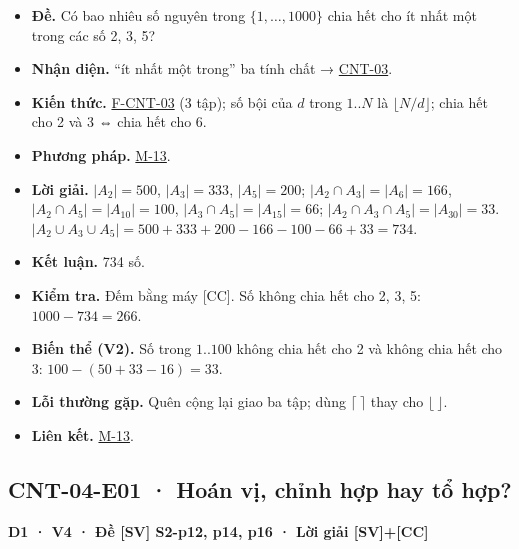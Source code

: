 \documentclass[
  10pt,
  twoside,openany]{book}
\providecommand{\tightlist}{%
  \setlength{\itemsep}{0pt}\setlength{\parskip}{0pt}}
\begin{document}
\begin{itemize}
\tightlist
\item
  \textbf{Đề.} Có bao nhiêu số nguyên trong \(\{1,\dots,1000\}\) chia
  hết cho ít nhất một trong các số 2, 3, 5?
\item
  \textbf{Nhận diện.} ``ít nhất một trong'' ba tính chất →
  \protect\hyperlink{CNT-03}{CNT-03}.
\item
  \textbf{Kiến thức.} \protect\hyperlink{F-CNT-03}{F-CNT-03} (3 tập); số
  bội của \(d\) trong \(1..N\) là \(\lfloor N/d\rfloor\); chia hết cho 2
  và 3 ⇔ chia hết cho 6.
\item
  \textbf{Phương pháp.} \protect\hyperlink{M-13}{M-13}.
\item
  \textbf{Lời giải.} \(|A_2|=500\), \(|A_3|=333\), \(|A_5|=200\);
  \(|A_2\cap A_3|=|A_6|=166\), \(|A_2\cap A_5|=|A_{10}|=100\),
  \(|A_3\cap A_5|=|A_{15}|=66\); \(|A_2\cap A_3\cap A_5|=|A_{30}|=33\).
  \(|A_2\cup A_3\cup A_5|=500+333+200-166-100-66+33=734\).
\item
  \textbf{Kết luận.} 734 số.
\item
  \textbf{Kiểm tra.} Đếm bằng máy {[}CC{]}. Số không chia hết cho 2, 3,
  5: \(1000-734=266\).
\item
  \textbf{Biến thể (V2).} Số trong \(1..100\) không chia hết cho 2 và
  không chia hết cho 3: \(100-(50+33-16)=33\).
\item
  \textbf{Lỗi thường gặp.} Quên cộng lại giao ba tập; dùng
  \(\lceil\ \rceil\) thay cho \(\lfloor\ \rfloor\).
\item
  \textbf{Liên kết.} \protect\hyperlink{M-13}{M-13}.
\end{itemize}

\hypertarget{CNT-04-E01}{%
\subsection{CNT-04-E01 · Hoán vị, chỉnh hợp hay tổ
hợp?}\label{CNT-04-E01}}

\textbf{D1 · V4 · Đề {[}SV{]} S2-p12, p14, p16 · Lời giải
{[}SV{]}+{[}CC{]}}
\end{document}
